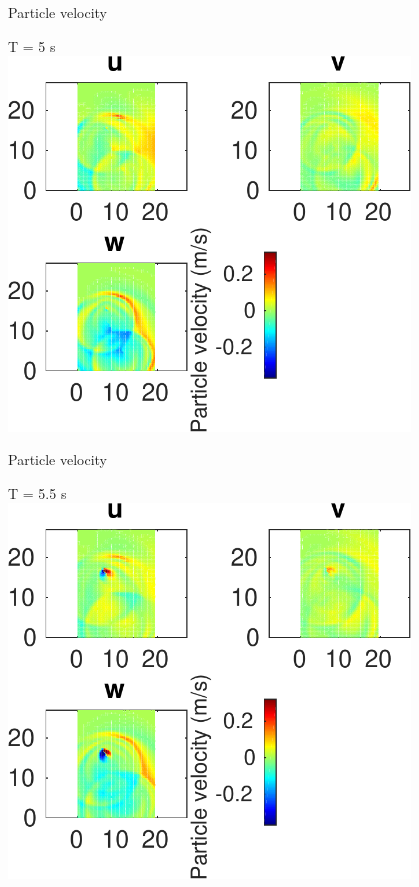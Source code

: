 \documentclass{beamer}
\begin{document}
\begin{frame}
 {Particle velocity}
 
 \centering \Large T = 5 s\\
 \includegraphics[width=0.8\textwidth]{images/horizontal_velo_00056}
 
\end{frame}

\begin{frame}
 {Particle velocity}
 
 \centering \Large T = 5.5 s\\
 \includegraphics[width=0.8\textwidth]{images/horizontal_velo_00061}
 
\end{frame}
\end{document}
